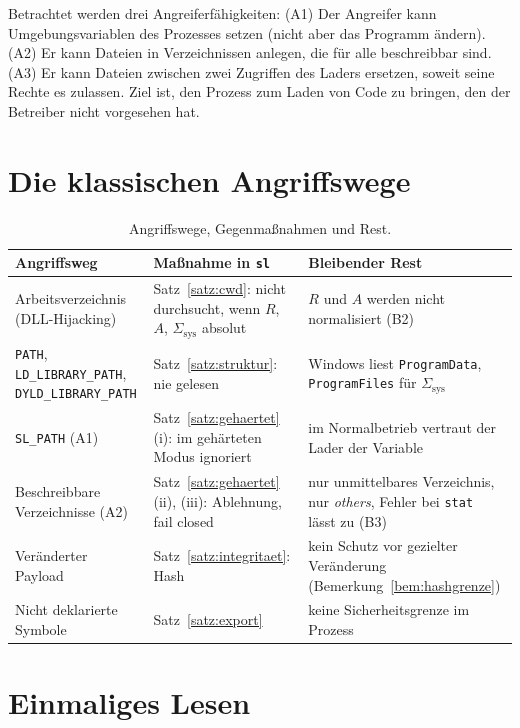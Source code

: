 Betrachtet werden drei Angreiferfähigkeiten: (A1) Der Angreifer kann Umgebungsvariablen des Prozesses setzen (nicht aber das Programm ändern). (A2) Er kann Dateien in Verzeichnissen anlegen, die für alle beschreibbar sind. (A3) Er kann Dateien zwischen zwei Zugriffen des Laders ersetzen, soweit seine Rechte es zulassen. Ziel ist, den Prozess zum Laden von Code zu bringen, den der Betreiber nicht vorgesehen hat.

\section{Die klassischen Angriffswege}

\begin{table}[!ht]
	\centering
	\small
	\begin{tabularx}{\textwidth}{@{}L{3.6cm}L{4.4cm}Y@{}}
		\toprule
		Angriffsweg & Maßnahme in \texttt{sl} & Bleibender Rest \\
		\midrule
		Arbeitsverzeichnis (DLL-Hijacking) & Satz~\ref{satz:cwd}: nicht durchsucht, wenn $R$, $A$, $\Sigma_{\mathrm{sys}}$ absolut & $R$ und $A$ werden nicht normalisiert (B2) \\[0.3em]
		\texttt{PATH}, \texttt{LD\_LIBRARY\_PATH}, \texttt{DYLD\_LIBRARY\_PATH} & Satz~\ref{satz:struktur}: nie gelesen & Windows liest \texttt{ProgramData}, \texttt{ProgramFiles} für $\Sigma_{\mathrm{sys}}$ \\[0.3em]
		\texttt{SL\_PATH} (A1) & Satz~\ref{satz:gehaertet}(i): im gehärteten Modus ignoriert & im Normalbetrieb vertraut der Lader der Variable \\[0.3em]
		Beschreibbare Verzeichnisse (A2) & Satz~\ref{satz:gehaertet}(ii), (iii): Ablehnung, fail closed & nur unmittelbares Verzeichnis, nur \emph{others}, Fehler bei \texttt{stat} lässt zu (B3) \\[0.3em]
		Veränderter Payload & Satz~\ref{satz:integritaet}: Hash & kein Schutz vor gezielter Veränderung (Bemerkung~\ref{bem:hashgrenze}) \\[0.3em]
		Nicht deklarierte Symbole & Satz~\ref{satz:export} & keine Sicherheitsgrenze im Prozess \\
		\bottomrule
	\end{tabularx}
	\caption{Angriffswege, Gegenmaßnahmen und Rest.}
	\label{tab:angriff}
\end{table}

\section{Einmaliges Lesen}
\label{sec:toctou}

